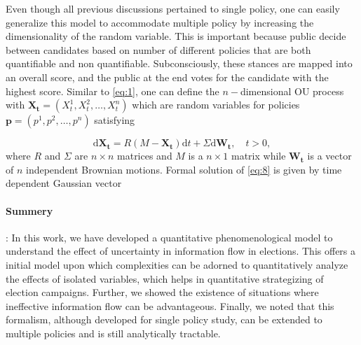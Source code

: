 \documentclass[aps,prl,twocolumn,showpacs,final]{revtex4-2}
\begin{document}

Even though all previous discussions pertained to single policy, one can easily generalize this model to accommodate multiple policy by increasing the dimensionality of the random variable. This is important because public decide between candidates based on number of different policies that are both quantifiable and non quantifiable. Subconsciously, these stances are mapped into an overall score, and the public at the end votes for the candidate with the highest score. Similar to \eqref{eq:1}, one can define the $n-$dimensional OU process with $\mathbf{X_t}=(X^1_t,X^2_t,\ldots,X^n_t)$ which are random variables for policies $\mathbf{p}=(p^1,p^2,\ldots,p^n)$ satisfying

\begin{equation}
\mathrm{d} \mathbf{X_{t}}=R\left(M-\mathbf{X_{t}}\right) \mathrm{d} t+\Sigma \mathrm{d} \mathbf{W_{t}}, \quad t>0 \label{eq:8},
\end{equation}
where $R$ and $\Sigma$ are $n\times n$ matrices and $M$ is a $n \times 1$ matrix while $\mathbf{W_{t}}$ is a vector of $n$ independent Brownian motions. Formal solution of \eqref{eq:8} is given by time dependent Gaussian vector\cite{vatiwutipong2019alternative}

\paragraph*{Summery}: In this work, we have developed a quantitative phenomenological model to understand the effect of uncertainty in information flow in elections. This offers a initial model upon which complexities can be adorned to quantitatively analyze the effects of isolated variables, which helps in quantitative strategizing of election campaigns. Further, we showed the existence of situations where ineffective information flow can be advantageous. Finally, we noted that this formalism, although developed for single policy study, can be extended to multiple policies and is still analytically tractable.

\end{document}
